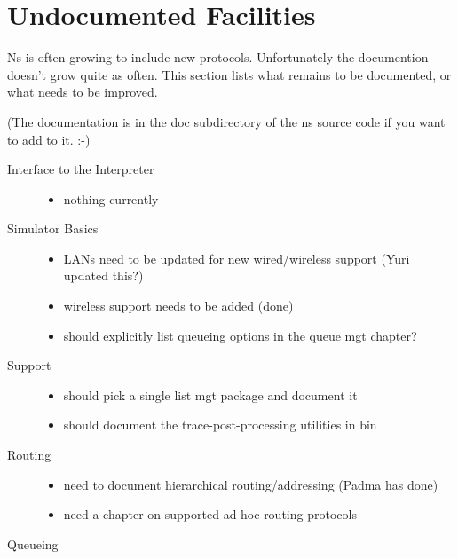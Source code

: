 
\chapter{Undocumented Facilities}

Ns is often growing to include new protocols.
Unfortunately the documention doesn't grow quite as often.
This section lists what remains to be documented,
  or what needs to be improved.

(The documentation is in the doc subdirectory of the ns source code
  if you want to add to it. :-)

\begin{description}
\item[Interface to the Interpreter]

	\begin{itemize}
	\item nothing currently
	\end{itemize}

\item[Simulator Basics]

	\begin{itemize}
	\item LANs need to be updated for new wired/wireless support
		(Yuri updated this?)
	\item wireless support needs to be added
		(done)
	\item should explicitly list queueing options in the queue mgt chapter?
	\end{itemize}

\item[Support]

	\begin{itemize}
	\item should pick a single list mgt package and document it
	\item should document the trace-post-processing utilities in bin
	\end{itemize}

\item[Routing]

	\begin{itemize}
	\item need to document hierarchical routing/addressing
		(Padma has done)
	\item need a chapter on supported ad-hoc routing protocols
	\end{itemize}

\item[Queueing]


\end{description}
